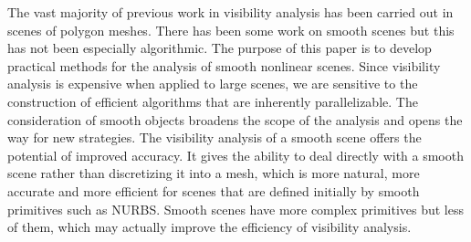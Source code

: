 \documentclass[9pt,twocolumn]{article}
\newif\ifJournal
\begin{document}
\ifJournal
[Only when penumbra is included]
It reveals locations from which the distinguished object is completely accessible, 
with no intervening object blocking the view,
such as seating locations that see the entire stage,
camera locations that see the face of an actor,
painter nozzle locations that see the object to be painted,
or X-ray locations that see the tumor.
\fi



The vast majority of previous work in visibility analysis
has been carried out in scenes of polygon meshes.
There has been some work on smooth scenes but this has not been especially algorithmic.
The purpose of this paper is to develop practical methods for the analysis
of smooth nonlinear scenes.
Since visibility analysis is expensive when applied to large scenes,
we are sensitive to the construction of efficient algorithms that are inherently
parallelizable.
The consideration of smooth objects broadens the scope of the analysis and
opens the way for new strategies.
The visibility analysis of a smooth scene offers the potential of improved accuracy.
It gives the ability to deal directly with a smooth scene rather than discretizing it
into a mesh, which is more natural, more accurate and more efficient for scenes that
are defined initially by smooth primitives such as NURBS.
Smooth scenes have more complex primitives but less of them, which may
actually improve the efficiency of visibility analysis.

\end{document}
